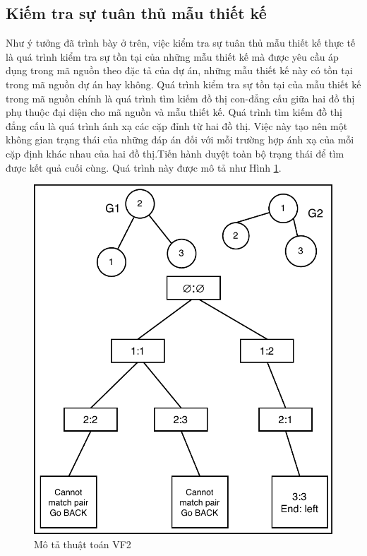 \documentclass[12pt]{report}
\begin{document}
\subsection{Kiếm tra sự tuân thủ mẫu thiết kế}
Như ý tưởng đã trình bày ở trên, việc kiểm tra sự tuân thủ mẫu thiết kế thực tế là quá trình kiểm tra sự tồn tại của những mẫu thiết kế mà được yêu cầu áp dụng trong mã nguồn theo đặc tả của dự án, những mẫu thiết kế này có tồn tại trong mã nguồn dự án hay không.
Quá trình kiểm tra sự tồn tại của mẫu thiết kế trong mã nguồn chính là quá trình tìm kiếm đồ thị con-đẳng cấu giữa hai đồ thị phụ thuộc đại diện cho mã nguồn và mẫu thiết kế. Quá trình tìm kiếm đồ thị đẳng cấu là quá trình ánh xạ các cặp đỉnh từ hai đồ thị. Việc này tạo nên một không gian trạng thái của những đáp án đối với mỗi trường hợp ánh xạ của mỗi cặp định khác nhau của hai đồ thị.Tiến hành duyệt toàn bộ trạng thái để tìm được kết quả cuối cùng. Quá trình này được mô tả như Hình \ref{fig:vf2_example}.
\begin{figure}[!htbp]
	\centering
	\includegraphics[scale=0.65]{images/_vf2_example.pdf}
	\caption{Mô tả thuật toán VF2}
	\label{fig:vf2_example}
\end{figure}\\
\end{document}

